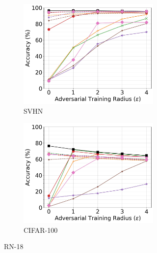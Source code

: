 \documentclass[conference]{IEEEtran}
\theoremstyle{definition}
\theoremstyle{remark}
\theoremstyle{proposition}
\begin{document}
\begin{figure}[p!]
\begin{subfigure}{1.0\textwidth}
\begin{subfigure}{.3\textwidth}
		\includegraphics[width=1.0\textwidth]{RN-18_AT_SVHN.jpg}
		\caption*{SVHN}
		\label{fig:at_svhn:rn18}
	\end{subfigure}\hspace*{0.75em}
	\begin{subfigure}{.3\textwidth}
		\centering
		\includegraphics[width=1.0\textwidth]{RN-18_AT_CIFAR-100.jpg}
		\caption*{CIFAR-100}
		\label{fig:at_cifar100:rn18}
	\end{subfigure}
    \caption{RN-18}
	\label{fig:at_rn18}
    \end{subfigure}\\\vspace*{0.5em}
	    \begin{subfigure}{1.0\textwidth}

\end{subfigure}
\end{figure}
\end{document}

